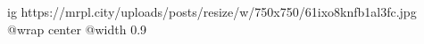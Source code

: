  
 
 
 
 

\ifcmt
  ig https://mrpl.city/uploads/posts/resize/w/750x750/61ixo8knfb1al3fc.jpg
  @wrap center
  @width 0.9
\fi
